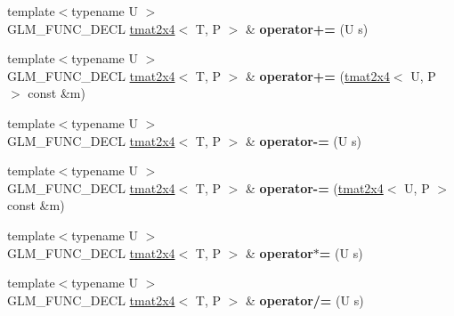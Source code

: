 \begin{DoxyCompactItemize}
\item 
\mbox{\label{structglm_1_1tmat2x4_a9df37229e9c50f1022701ffc52dcd1d2}} 
{\footnotesize template$<$typename U $>$ }\\G\+L\+M\+\_\+\+F\+U\+N\+C\+\_\+\+D\+E\+CL \hyperlink{structglm_1_1tmat2x4}{tmat2x4}$<$ T, P $>$ \& {\bfseries operator+=} (U s)
\item 
\mbox{\label{structglm_1_1tmat2x4_a3fb9f1795e6f87a9822678ffcd1f6d9d}} 
{\footnotesize template$<$typename U $>$ }\\G\+L\+M\+\_\+\+F\+U\+N\+C\+\_\+\+D\+E\+CL \hyperlink{structglm_1_1tmat2x4}{tmat2x4}$<$ T, P $>$ \& {\bfseries operator+=} (\hyperlink{structglm_1_1tmat2x4}{tmat2x4}$<$ U, P $>$ const \&m)
\item 
\mbox{\label{structglm_1_1tmat2x4_a45b141f4b8af69b09a7acbdddc418247}} 
{\footnotesize template$<$typename U $>$ }\\G\+L\+M\+\_\+\+F\+U\+N\+C\+\_\+\+D\+E\+CL \hyperlink{structglm_1_1tmat2x4}{tmat2x4}$<$ T, P $>$ \& {\bfseries operator-\/=} (U s)
\item 
\mbox{\label{structglm_1_1tmat2x4_ae58d059cf5f674054e6a82f3fde4dadd}} 
{\footnotesize template$<$typename U $>$ }\\G\+L\+M\+\_\+\+F\+U\+N\+C\+\_\+\+D\+E\+CL \hyperlink{structglm_1_1tmat2x4}{tmat2x4}$<$ T, P $>$ \& {\bfseries operator-\/=} (\hyperlink{structglm_1_1tmat2x4}{tmat2x4}$<$ U, P $>$ const \&m)
\item 
\mbox{\label{structglm_1_1tmat2x4_a87bd7bad1ef757b47a7aa84b310a02be}} 
{\footnotesize template$<$typename U $>$ }\\G\+L\+M\+\_\+\+F\+U\+N\+C\+\_\+\+D\+E\+CL \hyperlink{structglm_1_1tmat2x4}{tmat2x4}$<$ T, P $>$ \& {\bfseries operator$\ast$=} (U s)
\item 
\mbox{\label{structglm_1_1tmat2x4_aa979764dc4e9915169cec5dd81b55b31}} 
{\footnotesize template$<$typename U $>$ }\\G\+L\+M\+\_\+\+F\+U\+N\+C\+\_\+\+D\+E\+CL \hyperlink{structglm_1_1tmat2x4}{tmat2x4}$<$ T, P $>$ \& {\bfseries operator/=} (U s)
\item 
\mbox{\label{structglm_1_1tmat2x4_a3cee5fba0b07ed5708aeea6b2d6fcf46}} 

\end{DoxyCompactItemize}
